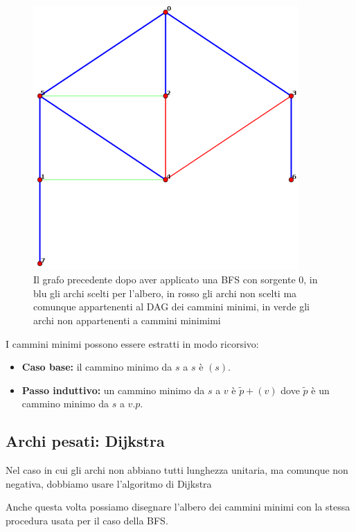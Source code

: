 \documentclass[a4paper,10pt]{amsbook}
\theoremstyle{plain}
\theoremstyle{definition}
\theoremstyle{remark}
\begin{document}
\begin{figure}[h]
  \centering
  \includegraphics[width=0.9\textwidth]{BFS}
  \caption{Il grafo precedente dopo aver applicato una BFS con
    sorgente $0$, in blu gli archi scelti per l'albero, in rosso gli
    archi non scelti ma comunque appartenenti al DAG dei cammini
    minimi, in verde gli archi non appartenenti a cammini minimimi}
  \label{fig:BFS}
\end{figure}

I cammini minimi possono essere estratti in modo ricorsivo:
\begin{itemize}
\item \textbf{Caso base:} il cammino minimo da $s$ a $s$ \`e $(s)$.
\item \textbf{Passo induttivo:} un cammino minimo da $s$ a $v$ \`e
  $\tilde p + (v)$ dove $\tilde p$ \`e un cammino minimo da $s$ a $v.p$.
\end{itemize}

\subsection{Archi pesati: Dijkstra}

Nel caso in cui gli archi non abbiano tutti lunghezza unitaria, ma
comunque non negativa, dobbiamo usare l'algoritmo di Dijkstra

\begin{figure}[H]
  \begin{algorithmic}
      
    \EndFor
        
        
     
    \EndIf
    \EndFor
    \EndWhile
  \end{algorithmic}
\end{figure}
Anche questa volta possiamo disegnare l'albero dei cammini minimi con
la stessa procedura usata per il caso della BFS.
\end{document}
